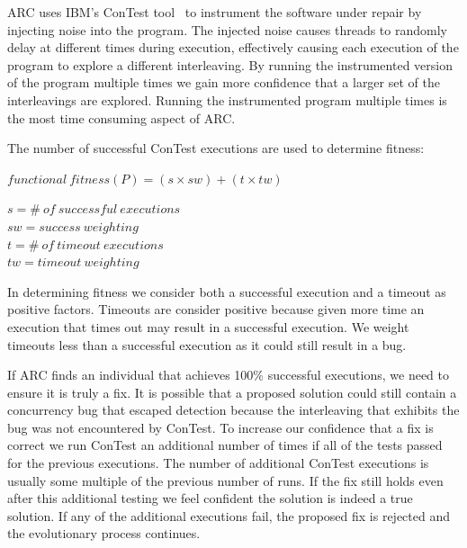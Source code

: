 ARC uses IBM's ConTest tool~\cite{EFN+02} to instrument the software under repair by injecting noise into the
program. The injected noise causes threads to randomly delay at different times during execution,
effectively causing each execution of the program to explore a different interleaving. By running the instrumented version of the program multiple times we gain more confidence that a larger set of the interleavings
are explored. Running the instrumented program multiple times is the most time
consuming aspect of ARC.

The number of successful ConTest executions are used to determine fitness:

\begin{footnotesize}
\begin{center}
$functional\ fitness(P) = (s \times sw) + (t \times tw)$
\end{center}
\end{footnotesize}
\begin{scriptsize}
\begin{center}
$s = \#\ of\ successful\ executions$ \\
$sw = success\ weighting$ \\
$t = \#\ of\ timeout\ executions$ \\
$tw = timeout\ weighting$
\end{center}
\end{scriptsize}

\noindent In determining fitness we consider both a successful execution and a timeout as positive factors. Timeouts are consider positive because given more time an execution that times out may result in a successful execution. We weight timeouts less than a successful execution as it could still result in a bug.

If ARC finds an individual that achieves 100\% successful executions, we need
to ensure it is truly a fix. It is possible that a proposed solution could
still contain a concurrency bug that escaped detection because the interleaving that exhibits the bug was not encountered by ConTest. To increase our confidence that a fix is correct we run ConTest
an additional number of times if all of the tests passed for the previous executions. The number of additional ConTest executions is usually some multiple of the previous number of runs. If the fix still holds even after this additional testing we feel confident the solution is indeed a true solution. If any of the additional executions fail,
the proposed fix is rejected and the evolutionary process continues.

